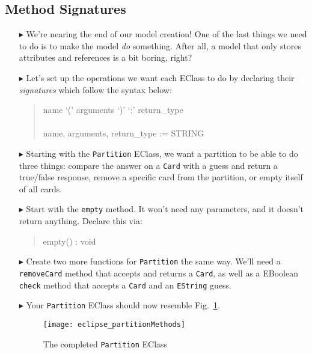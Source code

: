 \newpage
\subsection{Method Signatures}
\texHeader
\hypertarget{static:methods tex}{}

\begin{itemize}

\item[$\blacktriangleright$] We're nearing the end of our model creation! One of the last things we need to do is to make the model \emph{do} something. After
all, a model that only stores attributes and references is a bit boring, right?

\item[$\blacktriangleright$] Let's set up the operations we want each EClass to do by declaring their \emph{signatures} which follow the syntax below:
{ \begin{quote} \small
	name `(' arguments `)' `:' return\_type \\
	\\
	name, arguments, return\_type := STRING
\end{quote}}

\item[$\blacktriangleright$] Starting with the \texttt{Partition} EClass, we want a partition to be able to do three things: compare the answer on a
\texttt{Card} with a guess and return a true/false response, remove a specific card from the partition, or empty itself of all cards.

\item[$\blacktriangleright$] Start with the \texttt{empty} method. It won't need any parameters, and it doesn't return anything. Declare this via:
{ \begin{quote} \small
	empty() : void
\end{quote} }

\item[$\blacktriangleright$] Create two more functions for \texttt{Partition} the same way. We'll need a \texttt{removeCard} method that accepts and returns a
\texttt{Card}, as well as a EBoolean \texttt{check} method that accepts a \texttt{Card} and an \texttt{EString} guess. 

\item[$\blacktriangleright$] Your \texttt{Partition} EClass should now resemble Fig.~\ref{fig:partitionMethods}.

\vspace{0.5cm}

\begin{figure}[htbp]
	\centering
  \texttt{[image: eclipse\_partitionMethods]}
	\caption{The completed \texttt{Partition} EClass}
	\label{fig:partitionMethods}
\end{figure}


\end{itemize}
